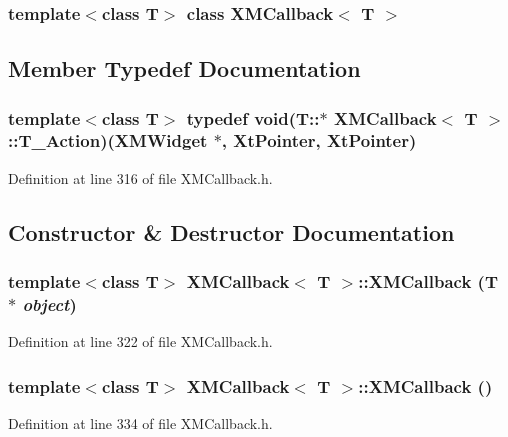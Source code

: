 \subsubsection*{template$<$class T$>$ class XMCallback$<$ T $>$}



\subsection{Member Typedef Documentation}
\subsubsection{\setlength{\rightskip}{0pt plus 5cm}template$<$class T$>$ typedef void(T::$\ast$ XMCallback$<$ T $>$::T\_\-Action)({\bf XMWidget} $\ast$, Xt\-Pointer, Xt\-Pointer)}\label{classXMCallback_s0}




Definition at line 316 of file XMCallback.h.

\subsection{Constructor \& Destructor Documentation}
\subsubsection{\setlength{\rightskip}{0pt plus 5cm}template$<$class T$>$ XMCallback$<$ T $>$::XMCallback (T $\ast$ {\em object})\hspace{0.3cm}{\tt  [inline]}}\label{classXMCallback_a0}




Definition at line 322 of file XMCallback.h.
\subsubsection{\setlength{\rightskip}{0pt plus 5cm}template$<$class T$>$ XMCallback$<$ T $>$::XMCallback ()\hspace{0.3cm}{\tt  [inline]}}\label{classXMCallback_a1}




Definition at line 334 of file XMCallback.h.
